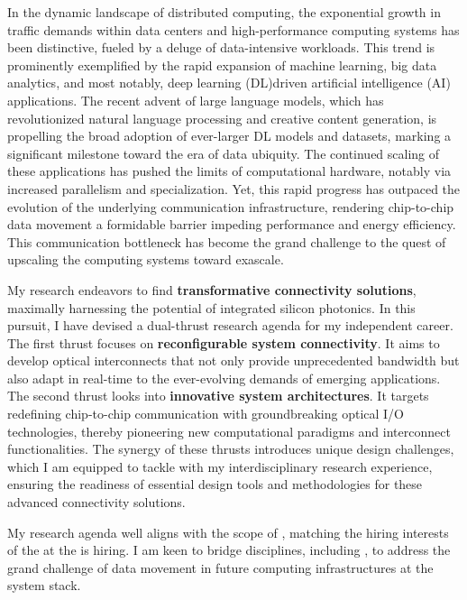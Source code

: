In the dynamic landscape of distributed computing, the exponential growth in traffic demands within data centers and high-performance computing systems has been distinctive, fueled by a deluge of data-intensive workloads. This trend is prominently exemplified by the rapid expansion of machine learning, big data analytics, and most notably, deep learning (DL)\textendash driven artificial intelligence (AI) applications. The recent advent of large language models, which has revolutionized natural language processing and creative content generation, is propelling the broad adoption of ever-larger DL models and datasets, marking a significant milestone toward the era of data ubiquity. The continued scaling of these applications has pushed the limits of computational hardware, notably via increased parallelism and specialization. Yet, this rapid progress has outpaced the evolution of the underlying communication infrastructure, rendering chip-to-chip data movement a formidable barrier impeding performance and energy efficiency. This communication bottleneck has become the grand challenge to the quest of upscaling the computing systems toward exascale.

My research endeavors to find \textbf{transformative connectivity solutions}, maximally harnessing the potential of integrated silicon photonics. In this pursuit, I have devised a dual-thrust research agenda for my independent career. The first thrust focuses on \textbf{reconfigurable system connectivity}. It aims to develop optical interconnects that not only provide unprecedented bandwidth but also adapt in real-time to the ever-evolving demands of emerging applications. The second thrust looks into \textbf{innovative system architectures}. It targets redefining chip-to-chip communication with groundbreaking optical I/O technologies, thereby pioneering new computational paradigms and interconnect functionalities. The synergy of these thrusts introduces unique design challenges, which I am equipped to tackle with my interdisciplinary research experience, ensuring the readiness of essential design tools and methodologies for these advanced connectivity solutions.

My research agenda well aligns with the scope of \appArea{}, matching the hiring interests of the \appDept{} at the \appSchool{} is hiring. I am keen to bridge disciplines, including \appCollab{}, to address the grand challenge of data movement in future computing infrastructures at the system stack.

